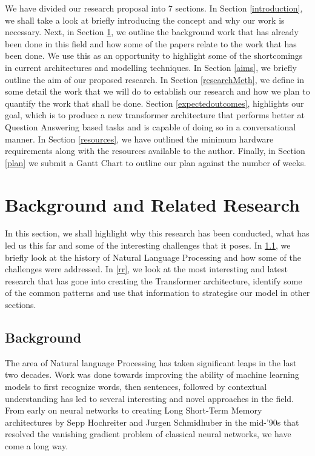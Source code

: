 \documentclass[11pt]{article}
\begin{document}
	We have divided our research proposal into 7 sections.
	In Section \ref{introduction}, we shall take a look at briefly introducing the concept and why our work is necessary. Next, in Section \ref{backRR}, we outline the background work that has already been done in this field and how some of the papers relate to the work that has been done. We use this as an opportunity to highlight some of the shortcomings in current architectures and modelling techniques. In Section \ref{aims}, we briefly outline the aim of our proposed research. In Section \ref{researchMeth}, we define in some detail the work that we will do to establish our research and how we plan to quantify the work that shall be done. Section \ref{expectedoutcomes}, highlights our goal, which is to produce a new transformer architecture that performs better at Question Answering based tasks and is capable of doing so in a conversational manner.
	In Section \ref{resources}, we have outlined the minimum hardware requirements along with the resources available to the author. Finally, in Section \ref{plan} we submit a Gantt Chart to outline our plan against the number of weeks.

	\section{Background and Related Research}\label{backRR}
	In this section, we shall highlight why this research has been conducted, what has led us this far and some of the interesting challenges that it poses. In \ref{back}, we briefly look at the history of Natural Language Processing and how some of the challenges were addressed. In \ref{rr}, we look at the most interesting and latest research that has gone into creating the Transformer architecture, identify some of the common patterns and use that information to strategise our model in other sections.
	\subsection{Background}\label{back}
	The area of Natural language Processing has taken significant leaps in the last two decades. Work was done towards improving the ability of machine learning models to first recognize words, then sentences, followed by contextual understanding has led to several interesting and novel approaches in the field. From early on neural networks to creating Long Short-Term Memory architectures \citep{originallstm} by Sepp Hochreiter and Jurgen Schmidhuber in the mid-'90s that resolved the vanishing gradient problem of classical neural networks, we have come a long way.
\end{document}
